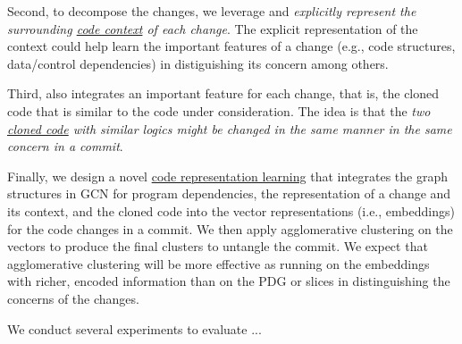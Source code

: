 Second, to decompose the changes, we leverage and {\em
  explicitly represent the surrounding \underline{code context} of
  each change}. The explicit representation of the context could help
{\tool} learn the important features of a change (e.g., code
structures, data/control dependencies) in distiguishing its concern
among others.

Third, {\tool} also integrates an important feature for
each change, that is, the cloned code that is similar to the code
under consideration. The idea is that the {\em two \underline{cloned code} with
  similar logics might be changed in the same manner in the same
  concern in a commit}.

Finally, we design a novel \underline{code representation learning}
that integrates the graph structures in GCN for program dependencies,
the representation of a change and its context, and the cloned code
into the vector representations (i.e., embeddings) for the code
changes in a commit. We then apply agglomerative clustering on the
vectors to produce the final clusters to untangle the commit. We
expect that agglomerative clustering will be more effective as running
on the embeddings with richer, encoded information than on the PDG or
slices in distinguishing the concerns of the changes.

We conduct several experiments to evaluate {\tool}...

